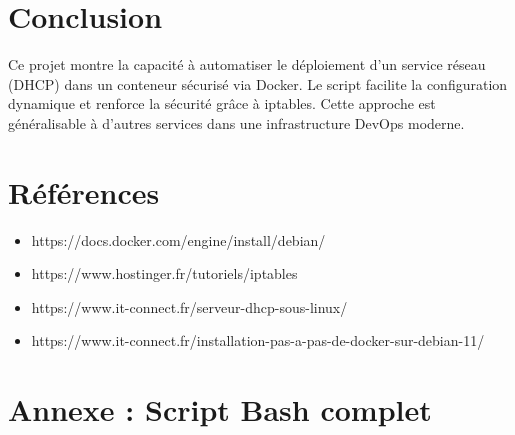 \section{Conclusion}
	Ce projet montre la capacité à automatiser le déploiement d’un service réseau (DHCP) dans un conteneur sécurisé via Docker. Le script facilite la configuration dynamique et renforce la sécurité grâce à iptables. Cette approche est généralisable à d’autres services dans une infrastructure DevOps moderne.
\newpage	
\section*{Références}
	\begin{itemize}
		\item {https://docs.docker.com/engine/install/debian/}
		\item {https://www.hostinger.fr/tutoriels/iptables}
		\item {https://www.it-connect.fr/serveur-dhcp-sous-linux/}
		\item {https://www.it-connect.fr/installation-pas-a-pas-de-docker-sur-debian-11/}
	\end{itemize}
	\newpage
	\section*{Annexe : Script Bash complet}
	
